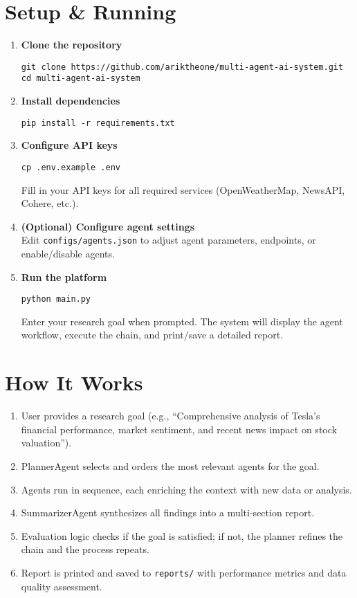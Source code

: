 \documentclass[12pt]{article}
\begin{document}
\section{Setup \& Running}

\begin{enumerate}
    \item \textbf{Clone the repository}
    \begin{verbatim}
git clone https://github.com/ariktheone/multi-agent-ai-system.git
cd multi-agent-ai-system
    \end{verbatim}
    \item \textbf{Install dependencies}
    \begin{verbatim}
pip install -r requirements.txt
    \end{verbatim}
    \item \textbf{Configure API keys}
    \begin{verbatim}
cp .env.example .env
    \end{verbatim}
    Fill in your API keys for all required services (OpenWeatherMap, NewsAPI, Cohere, etc.).
    \item \textbf{(Optional) Configure agent settings} \\
    Edit \texttt{configs/agents.json} to adjust agent parameters, endpoints, or enable/disable agents.
    \item \textbf{Run the platform}
    \begin{verbatim}
python main.py
    \end{verbatim}
    Enter your research goal when prompted. The system will display the agent workflow, execute the chain, and print/save a detailed report.
\end{enumerate}

\section{How It Works}

\begin{enumerate}
    \item User provides a research goal (e.g., ``Comprehensive analysis of Tesla's financial performance, market sentiment, and recent news impact on stock valuation'').
    \item PlannerAgent selects and orders the most relevant agents for the goal.
    \item Agents run in sequence, each enriching the context with new data or analysis.
    \item SummarizerAgent synthesizes all findings into a multi-section report.
    \item Evaluation logic checks if the goal is satisfied; if not, the planner refines the chain and the process repeats.
    \item Report is printed and saved to \texttt{reports/} with performance metrics and data quality assessment.
\end{enumerate}
\end{document}
